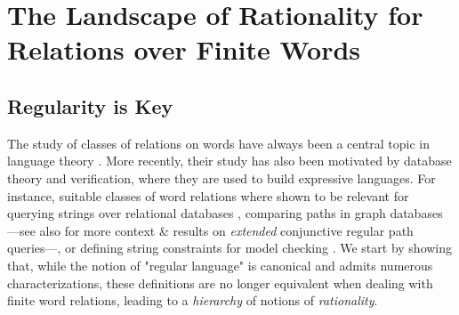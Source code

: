 \section{The Landscape of Rationality for Relations over Finite Words}
\label{sec:preliminaries-automatic-structures-relations}

\subsection{Regularity is Key}
\label{sec:preliminaries-automatic-structures-relations-landscape}

The study of classes of relations on words have always been a central topic in language theory
\cite{ElgotMezi1965RelationsGeneralizedAutomata,Nivat1968TransductionChomsky,Berstel1979Transductions,FrougnySakarovitch1993SynchronizedRationalRelations,Choffrut2006Survey}. 
More recently, their study has also been motivated by database theory and verification,
where they are used to build expressive languages. For instance,
suitable classes of word relations where shown to be relevant for querying strings over relational 
databases \cite{BenediktLibkinSchwentickSegoufin2003DefinableRelations}, comparing paths in graph databases \cite{BarceloLibkinLinWood2012ExpressiveLanguages}---see also \cite[\S~8, p.~17]{Figueira2020Containment21FoundationsGraphPathQueryLanguages}
for more context \& results on \emph{extended} conjunctive regular path queries---, or defining string constraints for model checking \cite{LinBarcelo2016StringSolvingWordEquationsTransducers}. 
We start by showing that, while the notion of "regular language" is canonical and admits 
numerous characterizations, these definitions are no longer equivalent when dealing
with finite word relations, leading to a \emph{hierarchy} of notions of \emph{rationality}.

